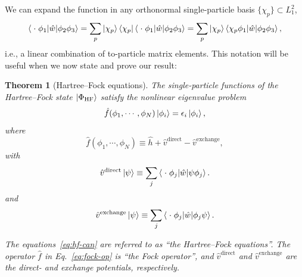 \documentclass{report}
\theoremstyle{plain}
\newtheorem{theorem}{Theorem}[chapter]
\theoremstyle{definition}
\begin{document}
We can expand the
function in any orthonormal single-particle basis $\{\chi_p\} \subset
L^2_1$,
\begin{equation}
  \braket{\;\cdot\; \phi_1|\hat{w}|\phi_2\phi_3} = \sum_p
  \ket{\chi_p}\bra{\chi_p}\braket{\;\cdot\; \phi_1|\hat{w}|\phi_2\phi_3}
    = \sum_p
  \ket{\chi_p}\braket{\chi_p \phi_1|\hat{w}|\phi_2\phi_3}, \label{eq:emptyslot}
\end{equation}
i.e., a linear combination of to-particle matrix elements.
This notation will be useful when we now state and prove our result:
\begin{theorem}[Hartree--Fock equations]\label{thm:hf-equations}
  The single-particle functions of the Hartree--Fock state
  $\ket{\Phi_\text{HF}}$ satisfy
  the nonlinear eigenvalue problem
  \begin{equation}
    \hat{f}(\phi_1,\cdots,\phi_N)\ket{\phi_i} = \epsilon_i
    \ket{\phi_i}, \label{eq:hf-can}
  \end{equation}
  where
  \begin{equation}
    \hat{f}(\phi_1,\cdots,\phi_N) \equiv \hat{h} + \hat{v}^\text{direct}
     - \hat{v}^\text{exchange},\label{eq:fock-op}
  \end{equation}
  with
  \begin{equation}
    \hat{v}^\text{direct}\ket{\psi} \equiv \sum_j \braket{\; \cdot \;
      \phi_j|\hat{w}|\psi\phi_j}. \label{eq:direct}
  \end{equation}
  and
  \begin{equation}
    \hat{v}^\text{exchange}\ket{\psi} \equiv \sum_j \braket{\; \cdot \;
      \phi_j|\hat{w}|\phi_j\psi}. \label{eq:exchange}
  \end{equation}

  The equations~\eqref{eq:hf-can} are
  referred to as ``the Hartree--Fock equations''. The operator
  $\hat{f}$ in Eq.~\eqref{eq:fock-op} is ``the Fock operator'', and
  $\hat{v}^\text{direct}$ and $\hat{v}^\text{exchange}$ are the direct-
  and exchange potentials, respectively.
\end{theorem}
\end{document}
